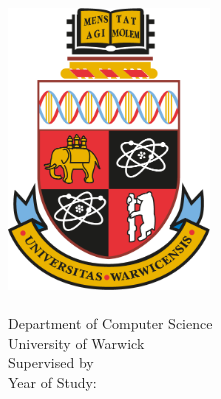 \makeatletter
{}
\begin{titlepage}
\begin{center}
    \textbf{\Huge \@title} \\[3cm]

    \includegraphics[width=0.4\textwidth]{crest.png}\\[3cm]

    \Large \textbf{\@author} \\
    Department of Computer Science \\
    University of Warwick \\[1cm]
    Supervised by \@supervisor \\
    Year of Study: \@yearofstudy \\

\end{center}
\end{titlepage}
\restoregeometry
\makeatother
